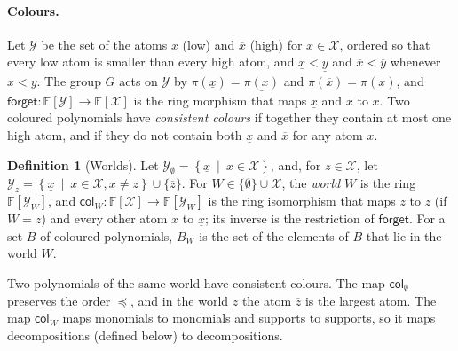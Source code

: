 \documentclass[12pt,a4paper,article]{memoir}
\newcommand{\struct}{\mathcal{X}}
\newcommand{\F}{\mathbb{F}}
\newcommand{\poly}[2]{#1[#2]}
\newcommand{\setof}[2]{\left\{#1\ \mid\ #2 \right\}}
\newcommand{\emphdef}[1]{\emph{\textcolor{BrickRed}{#1}}}
\newcommand{\lo}[1]{\underline{#1}}
\newcommand{\hi}[1]{\overline{#1}}
\newcommand{\col}{\mathsf{col}}
\newcommand{\forget}{\mathsf{forget}}
\theoremstyle{definition}
\newtheorem{definition}[theorem]{Definition}
\begin{document}
\paragraph{Colours.}
Let $\mathcal{Y}$ be the set of the atoms $\lo{x}$ (low) and $\hi{x}$ (high) for $x \in \struct$,
ordered so that every low atom is smaller than every high atom,
and $\lo{x} < \lo{y}$ and $\hi{x} < \hi{y}$ whenever $x < y$.
The group $G$ acts on $\mathcal{Y}$ by $\pi(\lo{x}) = \lo{\pi(x)}$ and $\pi(\hi{x}) = \hi{\pi(x)}$,
and $\forget \colon \poly{\F}{\mathcal{Y}} \to \poly{\F}{\struct}$ is the ring morphism
that maps $\lo{x}$ and $\hi{x}$ to $x$.
Two coloured polynomials have \emphdef{consistent colours}
if together they contain at most one high atom,
and if they do not contain both $\lo{x}$ and $\hi{x}$ for any atom $x$.

\begin{definition}[Worlds]\label{def:worlds}
Let $\mathcal{Y}_\emptyset = \setof{\lo{x}}{x \in \struct}$, and,
for $z \in \struct$, let $\mathcal{Y}_z = \setof{\lo{x}}{x \in \struct, x \neq z} \cup \{\hi{z}\}$.
For $W \in \{\emptyset\} \cup \struct$, the \emphdef{world} $W$ is the ring $\poly{\F}{\mathcal{Y}_W}$,
and $\col_W \colon \poly{\F}{\struct} \to \poly{\F}{\mathcal{Y}_W}$ is the ring isomorphism
that maps $z$ to $\hi{z}$ (if $W = z$) and every other atom $x$ to $\lo{x}$;
its inverse is the restriction of $\forget$.
For a set $B$ of coloured polynomials, $B_W$ is the set of the elements of $B$ that lie in the world $W$.
\end{definition}

Two polynomials of the same world have consistent colours.
The map $\col_\emptyset$ preserves the order $\preceq$,
and in the world $z$ the atom $\hi{z}$ is the largest atom.
The map $\col_W$ maps monomials to monomials and supports to supports,
so it maps decompositions (defined below) to decompositions.
\end{document}
